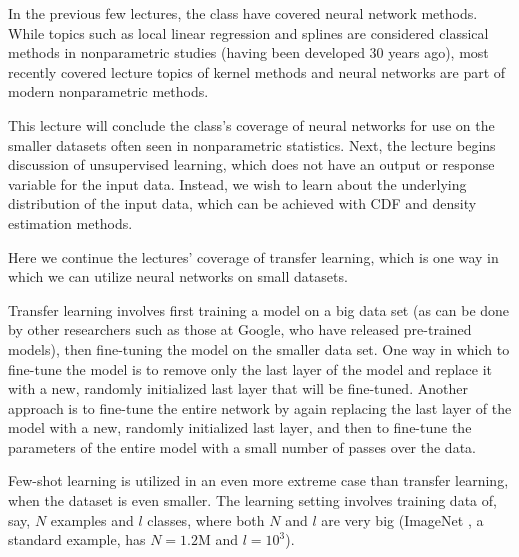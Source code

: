 


\setcounter{section}{0}


In the previous few lectures, the class have covered neural network methods. While topics such as local linear regression and splines are considered classical methods in nonparametric studies (having been developed 30 years ago), most recently covered lecture topics of kernel methods and neural networks are part of modern nonparametric methods.

This lecture will conclude the class's coverage of neural networks for use on the smaller datasets often seen in nonparametric statistics. Next, the lecture begins discussion of unsupervised learning, which does not have an output or response variable for the input data. Instead, we wish to learn about the underlying distribution of the input data, which can be achieved with CDF and density estimation methods. 



Here we continue the lectures' coverage of transfer learning, which is one way in which we can utilize neural networks on small datasets. 

Transfer learning involves first training a model on a big data set (as can be done by other researchers such as those at Google, who have released pre-trained models), then fine-tuning the model on the smaller data set. One way in which to fine-tune the model is to remove only the last layer of the model and replace it with a new, randomly initialized last layer that will be fine-tuned. Another approach is to fine-tune the entire network by again replacing the last layer of the model with a new, randomly initialized last layer, and then to fine-tune the parameters of the entire model with a small number of passes over the data.

Few-shot learning is utilized in an even more extreme case than transfer learning, when the dataset is even smaller. The learning setting involves training data of, say, $N$ examples and $l$ classes, where both $N$ and $l$ are very big (ImageNet \cite{deng2009imagenet}, a standard example, has $N = 1.2$M and $l = 10^3$).
 
